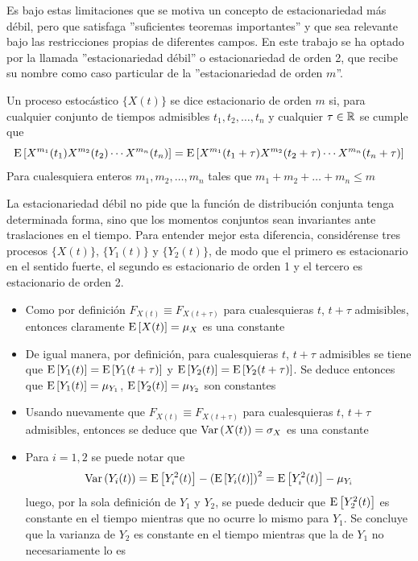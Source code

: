 Es bajo estas limitaciones que se motiva un concepto de estacionariedad m\'as d\'ebil, pero que
satisfaga ''suficientes teoremas importantes'' y que sea relevante bajo las restricciones
propias de diferentes campos. En este trabajo se ha optado por la llamada 
''estacionariedad d\'ebil'' o estacionariedad de orden 2, que recibe su nombre como caso
particular de la ''estacionariedad de orden $m$''.

\begin{defn}
Un proceso estoc\'astico $\{ X(t) \}$
se dice estacionario de orden $m$ si, para cualquier 
conjunto de tiempos admisibles $t_1,t_2,\dots,t_n$ y cualquier $\tau \in \mathbb{R}$
se cumple que
\begin{equation*}
\mathrm{E}\left[  X^{m_1}(t_1)X^{m_2}(t_2)\cdots X^{m_n}(t_n)  \right]
=
\mathrm{E}\left[  X^{m_1}(t_1+\tau)X^{m_2}(t_2+\tau)\cdots X^{m_n}(t_n+\tau)  \right]
\end{equation*}
Para cualesquiera enteros $m_1,m_2,\dots,m_n$ tales que $m_1+m_2+\dots+m_n \leq m$
\end{defn}

La estacionariedad d\'ebil no pide que la funci\'on
de distribuci\'on conjunta tenga determinada forma, sino que los momentos conjuntos sean 
invariantes ante traslaciones en el tiempo. Para entender mejor esta diferencia, consid\'erense
tres procesos $\{X(t)\}$, $\{Y_1(t)\}$ y $\{Y_2(t)\}$, de modo que el primero es
estacionario en el sentido fuerte, el segundo es estacionario de orden 1 y el tercero es
estacionario de orden 2.
\begin{itemize}
\item Como por definici\'on $F_{X(t) } \equiv F_{X(t+\tau)}$ para cualesquieras $t$, $t+\tau$
admisibles, entonces claramente $\mathrm{E}\left[ X(t) \right] = \mu_X$ es una constante
\item De igual manera, por definici\'on,
para cualesquieras $t$, $t+\tau$ admisibles se tiene que $\mathrm{E}\left[ Y_1(t) \right]=\mathrm{E}\left[ Y_1(t+\tau) \right]$ y
$\mathrm{E}\left[ Y_2(t) \right]=\mathrm{E}\left[ Y_2(t+\tau) \right]$. Se deduce entonces que $\mathrm{E}\left[ Y_1(t) \right] = \mu_{Y_1}$, 
$\mathrm{E}\left[ Y_2(t) \right] = \mu_{Y_2}$ son constantes
\item Usando nuevamente que $F_{X(t) } \equiv F_{X(t+\tau)}$ para cualesquieras $t$, $t+\tau$
admisibles, entonces se deduce que $\mathrm{Var}\left( X(t) \right) = \sigma_X$ es una constante
\item Para $i = 1,2$ se puede notar que
$$\mathrm{Var}\left( Y_i(t) \right) = \mathrm{E}\left[ Y_i^{2}(t) \right] - \left( \mathrm{E}\left[ Y_i(t) \right] \right)^{2} = \mathrm{E}\left[ Y_i^{2}(t) \right] - \mu_{Y_i}$$
luego, por la sola definici\'on de $Y_1$ y $Y_2$, se puede deducir que $\mathrm{E}\left[ Y_2^{2}(t) \right]$ es
constante en el tiempo mientras que no ocurre lo mismo para $Y_1$. Se concluye que la varianza
de $Y_2$ es constante en el tiempo mientras que la de $Y_1$ no necesariamente lo es
\end{itemize}

